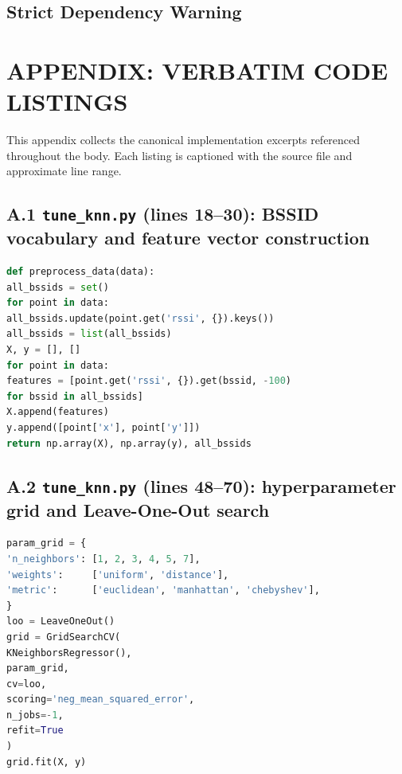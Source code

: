 \documentclass[11pt,a4paper]{article}
\begin{document}
\subsection{Strict Dependency Warning}
\begin{center}
\end{center}
\section{APPENDIX: VERBATIM CODE LISTINGS}
This appendix collects the canonical implementation excerpts referenced throughout the body. Each listing is captioned with the source file and approximate line range.
\subsection*{A.1 \texttt{tune\_knn.py} (lines 18--30): BSSID vocabulary and feature vector construction}
\begin{lstlisting}[language=Python]
def preprocess_data(data):
all_bssids = set()
for point in data:
all_bssids.update(point.get('rssi', {}).keys())
all_bssids = list(all_bssids)
X, y = [], []
for point in data:
features = [point.get('rssi', {}).get(bssid, -100)
for bssid in all_bssids]
X.append(features)
y.append([point['x'], point['y']])
return np.array(X), np.array(y), all_bssids
\end{lstlisting}
\subsection*{A.2 \texttt{tune\_knn.py} (lines 48--70): hyperparameter grid and Leave-One-Out search}
\begin{lstlisting}[language=Python]
param_grid = {
'n_neighbors': [1, 2, 3, 4, 5, 7],
'weights':     ['uniform', 'distance'],
'metric':      ['euclidean', 'manhattan', 'chebyshev'],
}
loo = LeaveOneOut()
grid = GridSearchCV(
KNeighborsRegressor(),
param_grid,
cv=loo,
scoring='neg_mean_squared_error',
n_jobs=-1,
refit=True
)
grid.fit(X, y)
\end{lstlisting}
\end{document}
